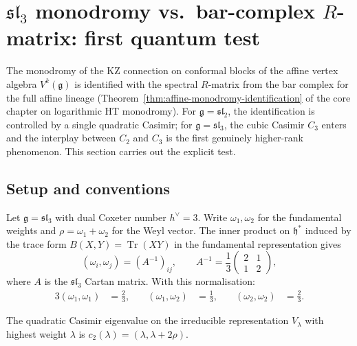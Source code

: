 \documentclass[11pt]{article}
\newcommand{\fg}{\mathfrak{g}}
\newcommand{\fh}{\mathfrak{h}}
\newcommand{\fsl}{\mathfrak{sl}}
\newcommand{\Tr}{\operatorname{Tr}}
\begin{document}
\section{$\fsl_3$ monodromy vs.\ bar-complex $R$-matrix: first quantum test}
\label{sec:sl3-monodromy-test}

The monodromy of the KZ connection on conformal blocks of the
affine vertex algebra $V^k(\fg)$ is identified with the spectral
$R$-matrix from the bar complex for the full affine lineage
(Theorem~\ref{thm:affine-monodromy-identification} of the core
chapter on logarithmic HT monodromy).  For $\fg = \fsl_2$, the
identification is controlled by a single quadratic Casimir; for
$\fg = \fsl_3$, the cubic Casimir $C_3$ enters and the interplay
between $C_2$ and $C_3$ is the first genuinely higher-rank
phenomenon.  This section carries out the explicit test.

\subsection{Setup and conventions}
\label{subsec:sl3-setup}

Let $\fg = \fsl_3$ with dual Coxeter number $h^\vee = 3$.
Write $\omega_1, \omega_2$ for the fundamental weights and
$\rho = \omega_1 + \omega_2$ for the Weyl vector.  The
inner product on $\fh^*$ induced by the trace form
$B(X,Y) = \Tr(XY)$ in the fundamental representation gives
\[
  (\omega_i, \omega_j) = (A^{-1})_{ij},
  \qquad
  A^{-1} = \frac{1}{3}\begin{pmatrix} 2 & 1 \\ 1 & 2 \end{pmatrix},
\]
where $A$ is the $\fsl_3$ Cartan matrix.  With this normalisation:
\begin{alignat*}{3}
  (\omega_1, \omega_1) &= \tfrac{2}{3}, &\quad
  (\omega_1, \omega_2) &= \tfrac{1}{3}, &\quad
  (\omega_2, \omega_2) &= \tfrac{2}{3}.
\end{alignat*}

The quadratic Casimir eigenvalue on the irreducible representation
$V_\lambda$ with highest weight $\lambda$ is
$c_2(\lambda) = (\lambda, \lambda + 2\rho)$.
\end{document}
